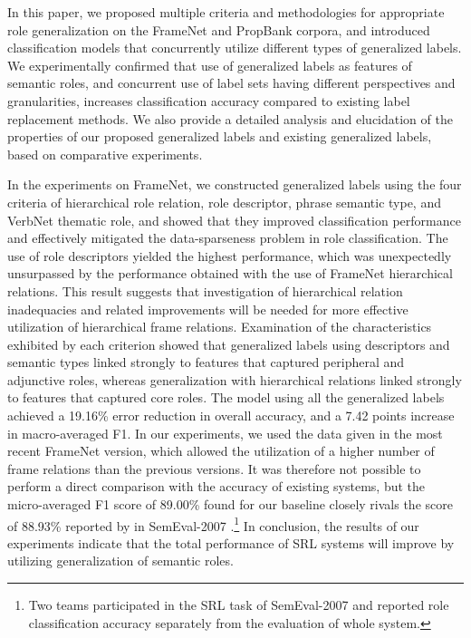 \documentclass[english]{jnlp_1.4_rep}
\begin{document}
In this paper, we proposed multiple criteria and methodologies for appropriate role generalization on the FrameNet and PropBank corpora, and introduced classification models that concurrently utilize different types of generalized labels.
We experimentally confirmed that use of generalized labels as features of semantic roles, and concurrent use of label sets having different perspectives and granularities, increases classification accuracy compared to existing label replacement methods. We also provide a detailed analysis and elucidation of the properties of our proposed generalized labels and existing generalized labels, based on comparative experiments.

In the experiments on FrameNet, we constructed generalized labels using the four criteria of hierarchical role relation, role descriptor, phrase semantic type, and VerbNet thematic role, and showed that they improved classification performance and effectively mitigated the data-sparseness problem in role classification. The use of role descriptors yielded the highest performance, which was unexpectedly unsurpassed by the performance obtained with the use of FrameNet hierarchical relations.
This result suggests that investigation of hierarchical relation inadequacies and related improvements will be needed for more effective utilization of hierarchical frame relations.
Examination of the characteristics exhibited by each criterion showed that generalized labels using descriptors and semantic types linked strongly to features that captured peripheral and adjunctive roles, whereas generalization with hierarchical relations linked strongly to features that captured core roles. The model using all the generalized labels achieved a 19.16\% error reduction in overall accuracy, and a 7.42 points increase in macro-averaged F1.
In our experiments, we used the data given in the most recent FrameNet version, which allowed the utilization of a higher number of frame relations than the previous versions. It was therefore not possible to perform a direct comparison with the accuracy of existing systems, but the micro-averaged F1 score of 89.00\% found for our baseline closely rivals the score of 88.93\% reported by  in SemEval-2007 \cite{baker-ellsworth-erk:2007:SemEval-2007}.\footnote{Two teams participated in the SRL task of SemEval-2007 and  reported role classification accuracy separately from the evaluation of whole system.}
In conclusion, the results of our experiments indicate that the total performance of SRL systems will improve by utilizing generalization of semantic roles.
\end{document}
